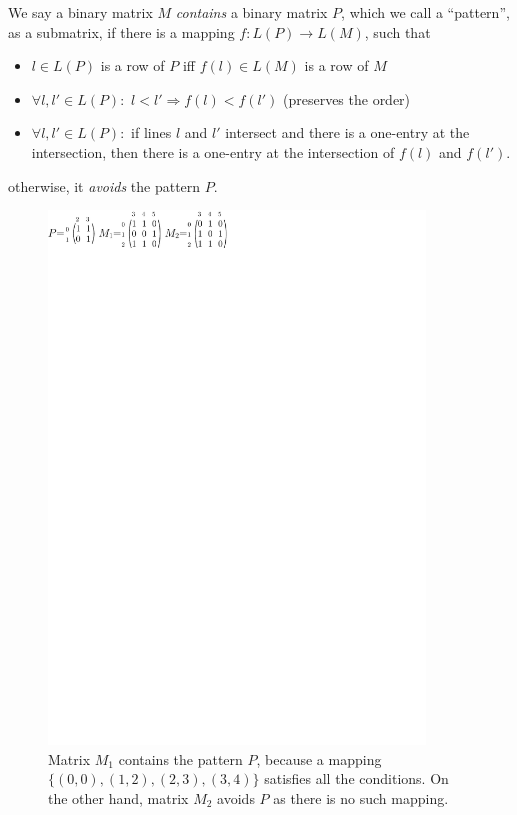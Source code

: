\begin{defn}
We say a binary matrix $M$ \emph{contains} a binary matrix $P$, which we call a ``pattern'', as a submatrix, if there is a mapping $f:L(P)\rightarrow L(M)$, such that
\begin{itemize}
\item $l\in L(P)$ is a row of $P$ iff $f(l)\in L(M)$ is a row of $M$
\item $\forall l,l'\in L(P):$ $l<l'\Rightarrow f(l)<f(l')$ (preserves the order)
\item $\forall l,l'\in L(P):$ if lines $l$ and $l'$ intersect and there is a one-entry at the intersection, then there is a one-entry at the intersection of $f(l)$ and $f(l')$.
\end{itemize}
otherwise, it \emph{avoids} the pattern $P$.
\end{defn}
\begin{figure}[h!]
\centering
\includegraphics[width=100mm]{../img/avoiding.pdf}
\caption{Matrix $M_1$ contains the pattern $P$, because a mapping $\{(0,0),(1,2),(2,3),(3,4)\}$ satisfies all the conditions. On the other hand, matrix $M_2$ avoids $P$ as there is no such mapping.}
\label{avoiding}
\end{figure}


